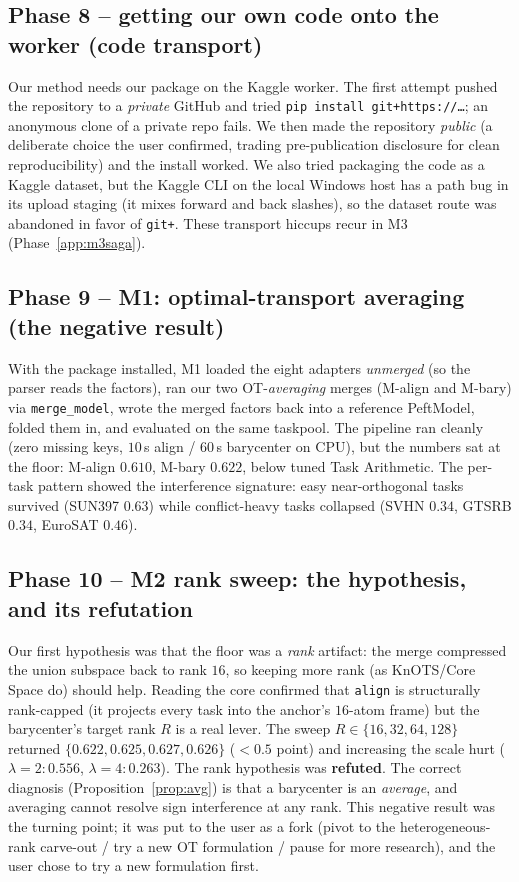 \subsection{Phase 8 -- getting our own code onto the worker (code transport)}
\label{app:transport}
Our method needs our package on the Kaggle worker. The first attempt pushed the repository to a
\emph{private} GitHub and tried \texttt{pip install git+https://\dots}; an anonymous clone of a private
repo fails. We then made the repository \emph{public} (a deliberate choice the user confirmed, trading
pre-publication disclosure for clean reproducibility) and the install worked. We also tried packaging the
code as a Kaggle dataset, but the Kaggle CLI on the local Windows host has a path bug in its upload
staging (it mixes forward and back slashes), so the dataset route was abandoned in favor of
\texttt{git+}. These transport hiccups recur in M3 (Phase~\ref{app:m3saga}).

\subsection{Phase 9 -- M1: optimal-transport averaging (the negative result)}
\label{app:m1}
With the package installed, M1 loaded the eight adapters \emph{unmerged} (so the parser reads the
factors), ran our two OT-\emph{averaging} merges (M-align and M-bary) via \texttt{merge\_model}, wrote the
merged factors back into a reference PeftModel, folded them in, and evaluated on the same taskpool. The
pipeline ran cleanly (zero missing keys, $10$\,s align / $60$\,s barycenter on CPU), but the numbers sat
at the floor: M-align $0.610$, M-bary $0.622$, below tuned Task Arithmetic. The per-task pattern showed
the interference signature: easy near-orthogonal tasks survived (SUN397 $0.63$) while conflict-heavy tasks
collapsed (SVHN $0.34$, GTSRB $0.34$, EuroSAT $0.46$).

\subsection{Phase 10 -- M2 rank sweep: the hypothesis, and its refutation}
\label{app:m2rank}
Our first hypothesis was that the floor was a \emph{rank} artifact: the merge compressed the union
subspace back to rank $16$, so keeping more rank (as KnOTS/Core Space do) should help. Reading the core
confirmed that \texttt{align} is structurally rank-capped (it projects every task into the anchor's
$16$-atom frame) but the barycenter's target rank $R$ is a real lever. The sweep
$R\in\{16,32,64,128\}$ returned $\{0.622, 0.625, 0.627, 0.626\}$ ($<0.5$ point) and increasing the scale
hurt ($\lambda{=}2\!: 0.556$, $\lambda{=}4\!: 0.263$). The rank hypothesis was \textbf{refuted}. The
correct diagnosis (Proposition~\ref{prop:avg}) is that a barycenter is an \emph{average}, and averaging
cannot resolve sign interference at any rank. This negative result was the turning point; it was put to
the user as a fork (pivot to the heterogeneous-rank carve-out / try a new OT formulation / pause for more
research), and the user chose to try a new formulation first.

